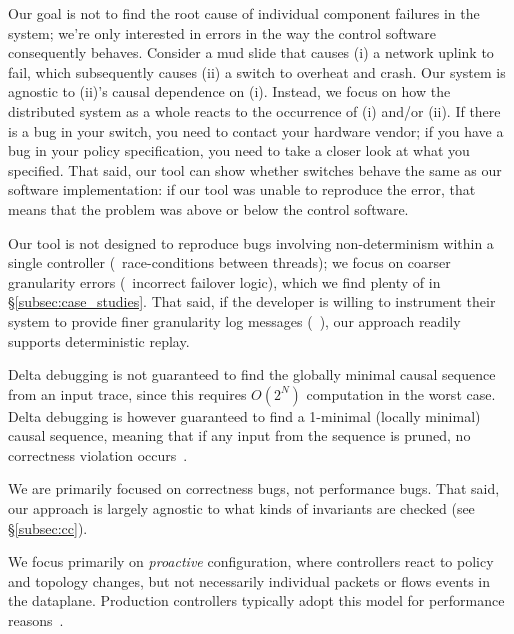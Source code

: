  Our goal is not to find the root
cause of individual component failures in the system; we're only interested in
errors in the way the control software consequently behaves.
Consider a mud slide that causes (i) a network uplink to fail, which subsequently
causes (ii) a switch to overheat and crash. Our
system is agnostic to (ii)'s causal dependence on (i). Instead, we focus on
how the distributed system as a whole reacts to the occurrence of (i) and/or (ii).
If there is a bug in your switch, you need to contact your hardware vendor;
if you have a bug in your policy specification, you need to take a closer look at what you specified.
That said, our tool can show whether switches behave the same as our software
implementation: if our tool was unable to reproduce the error, that means that
the problem was above or below the control software.

 Our tool is not designed to reproduce bugs
involving non-determinism within a single controller (\eg~race-conditions between threads);
we focus on coarser granularity errors (\eg~incorrect failover logic), which we find plenty of
in \S\ref{subsec:case_studies}.
That said, if the developer is willing to instrument their system to
provide finer granularity log messages (\cf~\cite{Geels:2006:RDD:1267359.1267386}),
our approach readily supports deterministic replay.

Delta debugging is not guaranteed to find the globally minimal
causal sequence from an input trace, since this requires $O(2^N)$ computation in the worst case.
Delta debugging is however guaranteed to find a 1-minimal (locally minimal) causal sequence,
meaning that if any input from the sequence is pruned, no correctness violation
occurs~\cite{Zeller:2002:SIF:506201.506206}. 

We are primarily focused on correctness bugs, not performance bugs. That said,
our approach is largely agnostic to what kinds of invariants are
checked (see \S\ref{subsec:cc}).

  We focus primarily on
\emph{proactive} configuration, where controllers react to policy and topology changes, but
 not necessarily individual packets or flows events in the dataplane.
Production controllers typically adopt this model for performance reasons~\cite{nicira}.



